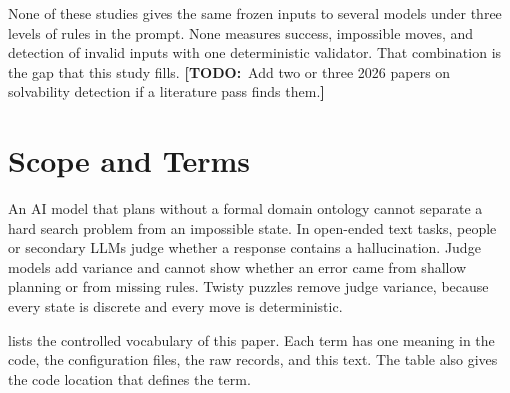 \documentclass[10pt,twocolumn,letterpaper]{article}
\newcommand{\todo}[1]{{\color{red!70!black}\textbf{[TODO:}~#1\textbf{]}}}
\begin{document}
None of these studies gives the same frozen inputs to several models under three levels of rules in the prompt. None measures success, impossible moves, and detection of invalid inputs with one deterministic validator. That combination is the gap that this study fills. \todo{Add two or three 2026 papers on solvability detection if a literature pass finds them.}

\section{Scope and Terms}\label{sec:terms}
An AI model that plans without a formal domain ontology cannot separate a hard search problem from an impossible state. In open-ended text tasks, people or secondary LLMs judge whether a response contains a hallucination. Judge models add variance and cannot show whether an error came from shallow planning or from missing rules. Twisty puzzles remove judge variance, because every state is discrete and every move is deterministic.

 lists the controlled vocabulary of this paper. Each term has one meaning in the code, the configuration files, the raw records, and this text. The table also gives the code location that defines the term.
\end{document}
